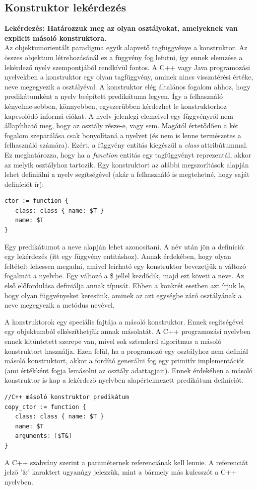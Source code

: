 \documentclass[a4paper,12pt]{report}
\begin{document}
\subsection{Konstruktor lekérdezés}
\textbf{Lekérdezés: Határozzuk meg az olyan osztályokat, amelyeknek van explicit másoló konstruktora.}
\\
Az objektumorientált paradigma egyik alapvető tagfüggvénye a konstruktor. Az összes objektum létrehozásánál ez a függvény fog lefutni, így ennek elemzése a lekérdező nyelv szempontjából rendkívül fontos. A C++ vagy Java programozási nyelvekben a konstruktor egy olyan tagfüggvény, aminek nincs visszatérési értéke, neve megegyezik a osztályéval. A konstruktor elég általános fogalom ahhoz, hogy predikátumként a nyelv beépített predikátuma legyen. Így a felhasználó kényelme-sebben, könnyebben, egyszerűbben kérdezhet le konstruktorhoz kapcsolódó informá-ciókat. A nyelv jelenlegi elemeivel egy függvényről nem állapítható meg, hogy az osztály része-e, vagy sem. Magától értetődően a két fogalom szeparálása csak bonyolítaná a nyelvet (és nem is lenne természetes a felhasználó számára). Ezért, a függvény entitás kiegészül a \textit{class} attribútummal. Ez meghatározza, hogy ha a \textit{function} entitás egy tagfüggvényt reprezentál, akkor az melyik osztályhoz tartozik. Egy konstruktort az alábbi megszorítások alapján lehet definiálni a nyelv segítségével (akár a felhasználó is megtehetné, hogy saját definíciót ír):
\begin{verbatim}
ctor := function {
   class: class { name: $T }
   name: $T
}
\end{verbatim}
\par Egy predikátumot a neve alapján lehet azonosítani. A név után jön a definíció: egy lekérdezés (itt egy függvény entitáshoz). Annak érdekében, hogy olyan feltételt lehessen megadni, amivel leírható egy konstruktor bevezetjük a változó fogalmát a nyelvbe. Egy változó a \$ jellel kezdődik, majd ezt követi a neve. Az első előfordulása definiálja annak típusát. Ebben a konkrét esetben azt írjuk le, hogy olyan függvényeket keresünk, aminek az azt egységbe záró osztályának a neve megegyezik a metódus nevével.
\par A konstruktorok egy speciális fajtája a másoló konstruktor. Ennek segítségével egy objektumból elkészíthetjük annak másolatát. A C++ programozási nyelvben ennek kitüntetett szerepe van, mivel sok sztenderd algoritmus a másoló konstruktort használja. Ezen felül, ha a programozó egy osztályhoz nem definiál másoló konstruktort, akkor a fordító generálni fog egy primitív implementációt (ami értékként fogja lemásolni az osztály adattagjait). Ennek érdekében a másoló konstruktor is kap a lekérdező nyelvben alapértelmezett predikátum definíciót.
\begin{verbatim}
//C++ másoló konstruktor predikátum
copy_ctor := function {
   class: class { name: $T }
   name: $T
   arguments: [$T&]
}
\end{verbatim}
\par A C++ szabvány szerint a paraméternek referenciának kell lennie. A referenciát jelző '\&' karaktert ugyanúgy jelezzük, mint a bármely más kulcsszót a C++ nyelvben. 
\end{document}
